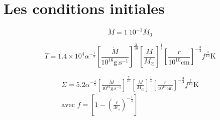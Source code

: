 \documentclass[french]{beamer}
\begin{document}
	\section{Les conditions initiales}
\begin{frame}
	\begin{equation*}
	\dot{M} = 1\ 10^{-1 }\dot{M_{0}}
\end{equation*} 

\begin{equation*}
	T = 1.4 \times 10^{4} \alpha^{- \frac{1}{5}} \left[ \frac{\dot{M}}{10^{16} \mathrm{g.s}^{-1}} \right]^{\frac{3}{10}} \left[ \frac{M}{M_\odot}\right]^{\frac{1}{4}} \left[ \frac{r}{10^{10}\mathrm{cm}}\right]^{- \frac{3}{4}} f^{\frac{3}{10}} \mathrm{K} 
\end{equation*}

\begin{align}
	\Sigma = 5.2 \alpha^{- \frac{4}{5}} \left[ \frac{\dot{M}}{10^{16} \mathrm{g.s}^{-1}} \right]^{\frac{7}{10}} \left[ \frac{M}{M_\odot}\right]^{\frac{1}{4}} \left[ \frac{r}{10^{10} \mathrm{cm}}\right]^{- \frac{3}{4}} f^{\frac{7}{10}} \mbox{K}  \\ 
	\text{avec } f = \left[ 1 - \left( \frac{r}{3 r_{s}}\right)^{- \frac{1}{2}}\right]
\end{align}
\end{frame}
\end{document}
